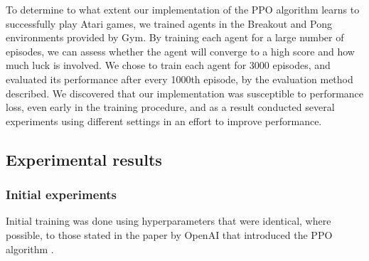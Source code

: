 \documentclass[12pt,a4paper]{article}
\begin{document}
To determine to what extent our implementation of the PPO algorithm learns to successfully play Atari games, we trained agents in the Breakout and Pong environments provided by Gym. By training each agent for a large number of episodes, we can assess whether the agent will converge to a high score and how much luck is involved. We chose to train each agent for 3000 episodes, and evaluated its performance after every 1000th episode, by the evaluation method described. We discovered that our implementation was susceptible to performance loss, even early in the training procedure, and as a result conducted several experiments using different settings in an effort to improve performance.

\subsection{Experimental results}
\subsubsection{Initial experiments}
Initial training was done using hyperparameters that were identical, where possible, to those stated in the paper by OpenAI that introduced the PPO algorithm \cite{DBLP:journals/corr/SchulmanWDRK17}. 
\end{document}
